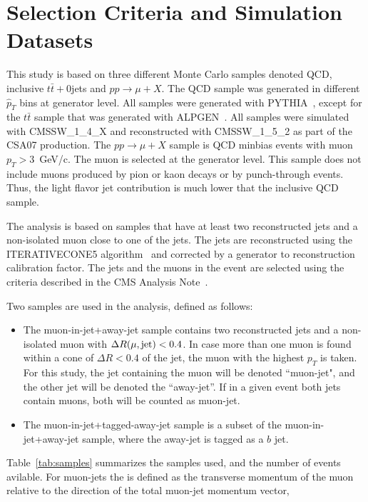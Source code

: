 \section{Selection Criteria and Simulation Datasets}
\label{sec:samples}

This study is based on three different Monte Carlo samples denoted QCD, 
inclusive $t\bar{t}+0$jets and $pp\rightarrow \mu +X$. The QCD sample 
was generated in different $\hat{p}_T $ bins at generator level. All
samples were generated with PYTHIA~\cite{ref:pythia}, except for the $t\bar{t} $ sample 
that was generated with ALPGEN~\cite{ref:alpgen}. All samples were simulated with 
CMSSW\_1\_4\_X and reconstructed with CMSSW\_1\_5\_2 as part of the CSA07
production. The $pp\rightarrow \mu +X $ sample is QCD minbias events with
muon $p_T > 3$~GeV/c. The muon is selected at the generator level. This
sample does not include muons produced by pion or kaon decays or by
punch-through events. Thus, the light flavor jet contribution is much
lower that the inclusive QCD sample.

The analysis is based on samples that have at least two reconstructed jets 
and a non-isolated muon close to one of the jets. The jets are reconstructed 
using the ITERATIVECONE5 algorithm~\cite{ref:iterativecone5} and corrected by a generator to 
reconstruction calibration factor. The jets and the muons in the event are
selected using the criteria described in the CMS Analysis 
Note~\cite{ref:btag_oldnote}.

Two samples are used in the analysis, defined as follows:
\begin{itemize} 
\item The  muon-in-jet+away-jet sample contains two reconstructed jets
and a non-isolated muon with $\Delta R(\mu,{\rm jet})<0.4$. In case 
more than one muon is found within a cone of $\Delta R<0.4$ of the jet, the 
muon with the highest $p_T$ is taken. For this study, the jet containing the 
muon will be denoted ``muon-jet",  and the other jet will be denoted the 
``away-jet''. If in a given event both jets contain muons, both will be 
counted as muon-jet. 
\item The muon-in-jet+tagged-away-jet sample is a subset of the 
muon-in-jet+away-jet sample, where the away-jet is tagged as a $b$ jet. 
\end{itemize}

Table~\ref{tab:samples} summarizes the samples used, and the number 
of events avilable.
For muon-jets the \ptrel is defined as the transverse momentum of the muon 
relative to the direction of the total muon-jet momentum vector,
 
